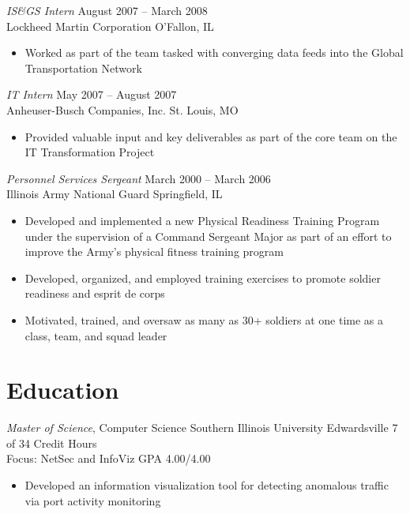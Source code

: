 \documentclass[margin,line]{resume}
\begin{document}
\begin{resume}
\begin{itemize}
\end{itemize}

{\sl IS\&GS Intern}                 \hfill  August 2007 -- March 2008\\
Lockheed Martin Corporation         \hfill  O'Fallon, IL
\begin{itemize} \itemsep -1pt %
\small\item Worked as part of the team tasked with converging data feeds into the Global Transportation Network
\end{itemize}

{\sl IT Intern}                     \hfill  May 2007 -- August 2007\\
Anheuser-Busch Companies, Inc.      \hfill  St. Louis, MO
\begin{itemize} \itemsep -1pt %
\small\item Provided valuable input and key deliverables as part of the core team on the IT Transformation Project
\end{itemize}

{\sl Personnel Services Sergeant}   \hfill   March 2000 -- March 2006\\
Illinois Army National Guard        \hfill   Springfield, IL
\begin{itemize} \itemsep -1pt %
\small\item Developed and implemented a new Physical Readiness Training Program under the supervision of a
            Command Sergeant Major as part of an effort to improve the Army's physical fitness training program
\small\item Developed, organized, and employed training exercises to promote soldier readiness and esprit de corps
\small\item Motivated, trained, and oversaw as many as 30+ soldiers at one time as a class, team, and squad leader
\end{itemize}

\section{Education}
{\small
  {\sl Master of Science}, Computer Science \hfill
  Southern Illinois University Edwardsville \hfill
  7 of 34 Credit Hours\\
  Focus: NetSec and InfoViz \hfill
  GPA 4.00/4.00
}
\begin{itemize} \itemsep -1pt %
\small\item[] Developed an information visualization tool for detecting anomalous traffic via port activity monitoring
\end{itemize}


\end{resume}
\end{document}
